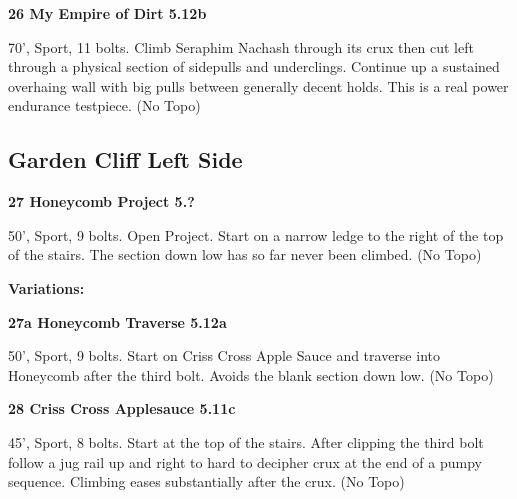 \begin{multicols}{2}
\needspace{1.5cm}
\label{rt:My Empire of Dirt}
\colorbox{Goldenrod!20}{
\parbox{0.95\linewidth}{
\textbf{
26 My Empire of Dirt 5.12b  
}}}
\begin{adjustwidth}{0.5cm}{}			
70', Sport, 11 bolts. Climb Seraphim Nachash through its crux then cut left through a physical section of sidepulls and underclings. Continue up a sustained overhaing wall with big pulls between generally decent holds. This is a real power endurance testpiece.
  (No Topo)
\end{adjustwidth}





\needspace{1.5cm}
\subsection*{Garden Cliff Left Side}\label{bf:Garden Cliff Left Side}
	


\needspace{1.5cm}
\label{rt:Honeycomb Project}
\colorbox{black!20}{
\parbox{0.95\linewidth}{
\textbf{
27 Honeycomb Project 5.?  
}}}
\begin{adjustwidth}{0.5cm}{}			
50', Sport, 9 bolts. Open Project. Start on a narrow ledge to the right of the top of the stairs. The section down low has so far never been climbed.
  (No Topo)
\end{adjustwidth}


\begin{adjustwidth}{0.5cm}{}				
\needspace{3cm}
\textbf{Variations:} \newline

\needspace{1.5cm}
\label{vr:Honeycomb Traverse}
\colorbox{Goldenrod!20}{
\parbox{0.95\linewidth}{
\textbf{
27a Honeycomb Traverse 5.12a  
}}}
\begin{adjustwidth}{0.5cm}{}			
50', Sport, 9 bolts. Start on Criss Cross Apple Sauce and traverse into Honeycomb after the third bolt. Avoids the blank section down low.
  (No Topo)
\end{adjustwidth}



\end{adjustwidth}


\needspace{1.5cm}
\label{rt:Criss Cross Applesauce}
\colorbox{RoyalBlue!20}{
\parbox{0.95\linewidth}{
\textbf{
28 Criss Cross Applesauce 5.11c  
}}}
\begin{adjustwidth}{0.5cm}{}			
45', Sport, 8 bolts. Start at the top of the stairs. After clipping the third bolt follow a jug rail up and right to hard to decipher crux at the end of a pumpy sequence. Climbing eases substantially after the crux.
  (No Topo)
\end{adjustwidth}





\end{multicols}
